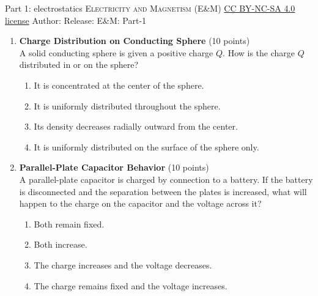 \newpage\handout
{Part 1: electrostatics}
{\textsc{Electricity and Magnetism (E\&M)}}
{\href{https://creativecommons.org/licenses/by-nc-sa/4.0/}{CC BY-NC-SA 4.0 license}}
{Author: \BookAuthor}{Release: \generatedOn}
{E\&M: Part-1}

\newpage

\begin{enumerate}
  \item \textbf{Charge Distribution on Conducting Sphere} (10 points)\\
  A solid conducting sphere is given a positive charge $Q$. How is the charge $Q$ distributed in or on the sphere?
  \begin{enumerate}[label=(\Alph*)]
    \item It is concentrated at the center of the sphere.
    \item It is uniformly distributed throughout the sphere.
    \item Its density decreases radially outward from the center.
    \item It is uniformly distributed on the surface of the sphere only.
  \end{enumerate}
  \begin{subanswer}
  \end{subanswer}

  \item \textbf{Parallel-Plate Capacitor Behavior} (10 points)\\
  A parallel-plate capacitor is charged by connection to a battery. If the battery is disconnected and the separation between the plates is increased, what will happen to the charge on the capacitor and the voltage across it?
  \begin{enumerate}[label=(\Alph*)]
    \item Both remain fixed.
    \item Both increase.
    \item The charge increases and the voltage decreases.
    \item The charge remains fixed and the voltage increases.
  \end{enumerate}
  \begin{subanswer}
  \end{subanswer}


\end{enumerate}
